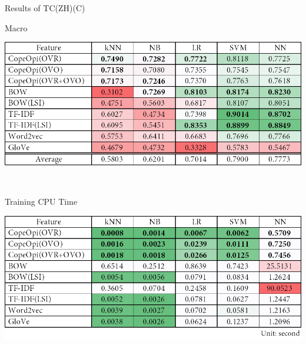 \begin{table}[H]
\caption{Results of TC(ZH)(C)}
\label{tab:tc_zh_c}
\centering
\begin{subtable}{\textwidth}
	\centering
	\caption{Macro \fscore{}}
	\includegraphics[width=\resultfigwidth]{chapters/ch4/table/tc/TC(ZH)(C).png}
\end{subtable}
\\[\tblskip]
\begin{subtable}{\textwidth}
	\centering
	\caption{Training CPU Time}
	\includegraphics[width=\resultfigwidth]{chapters/ch4/table/tc/TC(ZH)(C)T.png}
\end{subtable}
\end{table}